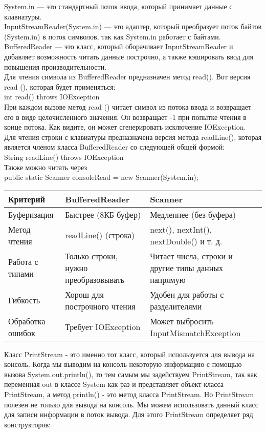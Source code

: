 System.in — это стандартный поток ввода, который принимает данные с клавиатуры. \\
InputStreamReader(System.in) — это адаптер, который преобразует поток байтов (System.in) в поток символов, так как System.in работает с байтами. \\
BufferedReader — это класс, который оборачивает InputStreamReader и добавляет возможность читать данные построчно, а также кэшировать ввод для повышения производительности. \\
Для чтения символа из BufferedReader предназначен метод read(). Вот
версия read (), которая будет применяться: \\
int read() throws IOException \\
При каждом вызове метод read () читает символ из потока ввода и возвращает его в виде целочисленного значения. Он возвращает -1 при попытке чтения в конце потока. Как видите, он может сгенерировать исключение IOException.  \\
Для чтения строки с клавиатуры предназначена версия метода readLine(), которая является членом класса BufferedReader со следующей общей формой: \\
String readLine() throws IOException \\
Также можно читать через \\
public static Scanner consoleRead = new Scanner(System.in); \\
\begin{table}[H]
\centering
\begin{tabular}{|l|l|l|}
\hline
\textbf{Критерий}       & \textbf{BufferedReader} & \textbf{Scanner} \\ \hline
Буферизация            & Быстрее (8КБ буфер)     & Медленнее (без буфера) \\ \hline
Метод чтения           & readLine() (строка)     & next(), nextInt(), nextDouble() и т. д. \\ \hline
Работа с типами        & Только строки, нужно преобразовывать & Читает числа, строки и другие типы данных напрямую \\ \hline
Гибкость               & Хорош для построчного чтения & Удобен для работы с разделителями \\ \hline
Обработка ошибок       & Требует IOException & Может выбросить InputMismatchException \\ \hline
\end{tabular}
\end{table}
\noindent Класс PrintStream - это именно тот класс, который используется для вывода на консоль. Когда мы выводим на консоль некоторую информацию с помощью вызова System.out.println(), то тем самым мы задействуем PrintStream, так как переменная out в классе System как раз и представляет объект класса PrintStream, а метод println() - это метод класса PrintStream. Но PrintStream полезен не только для вывода на консоль. Мы можем использовать данный класс для записи информации в поток вывода. Для этого PrintStream определяет ряд конструкторов:
